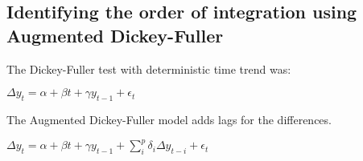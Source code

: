 
\subsection{Identifying the order of integration using Augmented Dickey-Fuller}

The Dickey-Fuller test with deterministic time trend was:

\(\Delta y_t=\alpha + \beta t + \gamma y_{t-1}+\epsilon_t \)

The Augmented Dickey-Fuller model adds lags for the differences.

\(\Delta y_t=\alpha + \beta t + \gamma y_{t-1}+\sum_i^p \delta_i \Delta y_{t-i} + \epsilon_t \)

